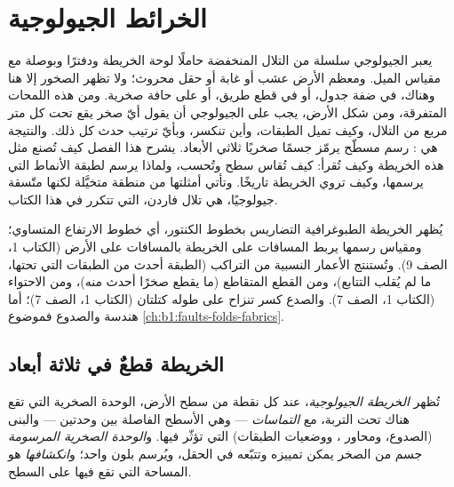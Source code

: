 \chapter{الخرائط الجيولوجية}\label{ch:b1:geological-maps}

يعبر الجيولوجي سلسلة من التلال المنخفضة حاملًا لوحة الخريطة ودفترًا وبوصلة مع مقياس الميل. ومعظم الأرض عشب أو غابة أو حقل محروث؛ ولا تظهر الصخور إلا هنا وهناك، في ضفة جدول، أو في قطع طريق، أو على حافة صخرية. ومن هذه اللمحات المتفرقة، ومن شكل الأرض، يجب على الجيولوجي أن يقول أيّ صخر يقع تحت كل متر مربع من التلال، وكيف تميل الطبقات، وأين تنكسر، وبأيّ ترتيب حدث كل ذلك. والنتيجة هي : رسم مسطّح يرمّز جسمًا صخريًا ثلاثي الأبعاد. يشرح هذا الفصل كيف تُصنع مثل هذه الخريطة وكيف تُقرأ: كيف تُقاس  سطح وتُحسب، ولماذا يرسم  لطبقة الأنماط التي يرسمها، وكيف تروي الخريطة تاريخًا. وتأتي أمثلتها من منطقة متخيَّلة لكنها متّسقة جيولوجيًا، هي تلال فاردن، التي تتكرر في هذا الكتاب.

\begin{recall}
يُظهر الخريطة الطبوغرافية التضاريس بخطوط الكنتور، أي خطوط الارتفاع المتساوي؛ ومقياس رسمها يربط المسافات على الخريطة بالمسافات على الأرض (الكتاب 1، الصف 9). وتُستنتج الأعمار النسبية من التراكب (الطبقة أحدث من الطبقات التي تحتها، ما لم يُقلب التتابع)، ومن القطع المتقاطع (ما يقطع صخرًا أحدث منه)، ومن الاحتواء (الكتاب 1، الصف 7). والصدع كسر تنزاح على طوله كتلتان (الكتاب 1، الصف 7)؛ أما هندسة  والصدوع فموضوع \cref{ch:b1:faults-folds-fabrics}.
\end{recall}

\section{الخريطة قطعٌ في ثلاثة أبعاد}\label{sec:b1:geological-maps:cut}

\begin{definition}\label{def:b1:geological-maps:geological-map}
تُظهر \emph{الخريطة الجيولوجية}، عند كل نقطة من سطح الأرض، الوحدة الصخرية التي تقع هناك تحت التربة، مع \emph{التماسات} --- وهي الأسطح الفاصلة بين وحدتين --- والبنى (الصدوع، ومحاور ، ووضعيات الطبقات) التي تؤثّر فيها. و\emph{الوحدة الصخرية المرسومة} جسم من الصخر يمكن تمييزه وتتبّعه في الحقل، ويُرسم بلون واحد؛ و\emph{انكشافها} هو المساحة التي تقع فيها على السطح.
\end{definition}

